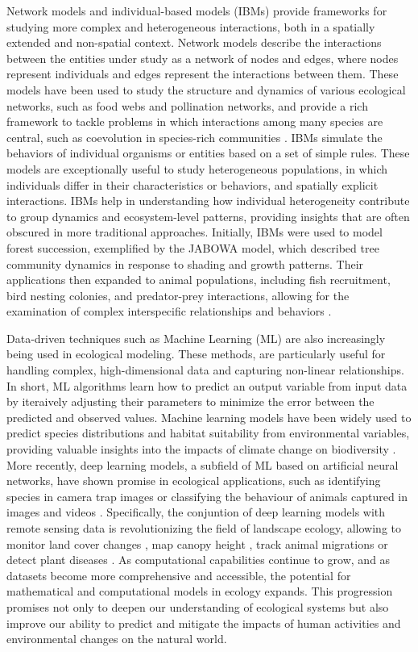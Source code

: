 Network models and individual-based models (IBMs) provide frameworks
for studying more complex and heterogeneous interactions, both in a spatially
extended and non-spatial context. Network models describe the interactions
between the entities under study as a network of nodes and edges, where nodes
represent individuals and edges represent the interactions between
them. These models have been used to study the structure and dynamics of
various ecological networks, such as food webs and pollination networks, and
provide a rich framework to tackle problems in which interactions among many
species are central, such as coevolution in species-rich communities
\cite{Bascompte2007}. IBMs simulate the behaviors of individual organisms or
entities based on a set of simple rules. These models are exceptionally useful
to study heterogeneous populations, in which individuals differ in their
characteristics or behaviors, and spatially explicit interactions. IBMs help in
understanding how individual heterogeneity contribute to group dynamics and
ecosystem-level patterns, providing insights that are often obscured in more
traditional approaches. Initially, IBMs were used to model forest succession,
exemplified by the JABOWA model, which described tree community dynamics in
response to shading and growth patterns. Their applications then expanded to
animal populations, including fish recruitment, bird nesting colonies, and
predator-prey interactions, allowing for the examination of complex
interspecific relationships and behaviors \cite{deangelis2014}.

Data-driven techniques such as Machine Learning (ML) are also increasingly
being used in ecological modeling. These methods, are particularly useful for
handling complex, high-dimensional data and capturing non-linear relationships.
In short, ML algorithms learn how to predict an output variable from input data
by iteraively adjusting their parameters to minimize the error between the
predicted and observed values. Machine learning models have been widely used to
predict species distributions and habitat suitability from environmental
variables, providing valuable insights into the impacts of climate change on
biodiversity \cite{Christin2019}. More recently, deep learning models, a
subfield of ML based on artificial neural networks, have shown promise in
ecological applications, such as identifying species in camera trap images
\cite{Tabak2019} or classifying the behaviour of animals captured in images and
videos \cite{Christin2019}. Specifically, the conjuntion of deep learning
models with remote sensing data is revolutionizing the field of landscape
ecology, allowing to monitor land cover changes \cite{Kussul2017}, map canopy
height \cite{Lang2023}, track animal migrations \cite{Wu2023} or detect plant
diseases \cite{Zarco-Tejada2021}. As computational capabilities continue to
grow, and as datasets become more comprehensive and accessible, the potential
for mathematical and computational models in ecology expands. This progression
promises not only to deepen our understanding of ecological systems but also
improve our ability to predict and mitigate the impacts of human activities and
environmental changes on the natural world.

